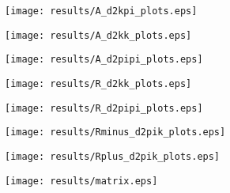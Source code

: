 \documentclass[11pt,a4paper]{article}
\begin{document}
\texttt{[image: results/A\_d2kpi\_plots.eps]}

\texttt{[image: results/A\_d2kk\_plots.eps]}

\texttt{[image: results/A\_d2pipi\_plots.eps]}


\texttt{[image: results/R\_d2kk\_plots.eps]}

\texttt{[image: results/R\_d2pipi\_plots.eps]}


\texttt{[image: results/Rminus\_d2pik\_plots.eps]}

\texttt{[image: results/Rplus\_d2pik\_plots.eps]}

\clearpage
\texttt{[image: results/matrix.eps]}
\end{document}
